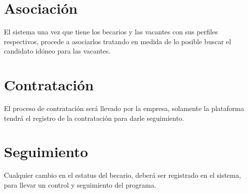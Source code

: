 \section{Asociación }

El sistema una vez que tiene los becarios y las vacantes con sus perfiles respectivos, procede a asociarlos tratando en medida de lo posible buscar el candidato idóneo para las vacantes.

\section{Contratación }

El proceso de contratación será llevado por la empresa, solamente la plataforma tendrá el registro de la contratación para darle seguimiento.

\section{Seguimiento }

Cualquier cambio en el estatus del becario, deberá ser registrado en el sistema, para llevar un control y seguimiento del programa.



